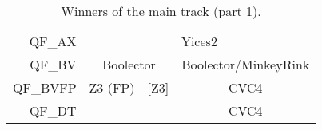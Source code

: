 \begin{table}[]
\begin{center}
{\begin{tabular}{rcccc}
\multicolumn{1}{r|}{QF\_AX}     & \multicolumn{4}{c|}{Yices2}                                                                                                                 \\ \cline{2-5} 
\multicolumn{1}{r|}{QF\_BV}     & \multicolumn{2}{c|}{Boolector}                                      & \multicolumn{2}{c|}{Boolector/MinkeyRink}                             \\ \cline{2-5} 
\multicolumn{1}{r|}{QF\_BVFP}   & \multicolumn{1}{c|}{Z3 (FP)}  & \multicolumn{2}{c|}{{[}Z3{]}}                                       & \multicolumn{1}{c|}{CVC4}             \\ \cline{2-5} 
QF\_DT                          & \multicolumn{1}{l}{}          & \multicolumn{1}{l|}{}               & \multicolumn{2}{c|}{CVC4}                                             \\ \cline{4-5} 
\end{tabular}}
\end{center}
\caption{\label{tab:winners-main-1} Winners of the main track (part 1).}
\end{table}


